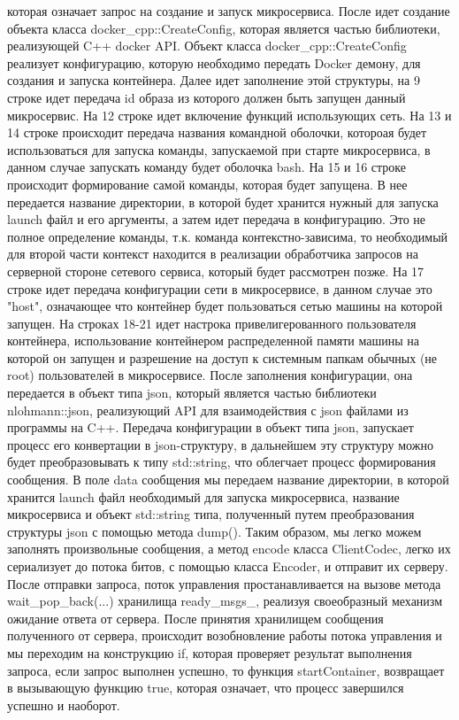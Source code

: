 \documentclass[a4paper, 14pt]{extreport}
\begin{document}
которая означает запрос на создание и запуск микросервиса. После идет создание объекта класса docker\_cpp::CreateConfig, которая является
частью библиотеки, реализующей C++ docker API. Объект класса docker\_cpp::CreateConfig реализует конфигурацию, которую необходимо 
передать Docker демону, для создания и запуска контейнера. Далее идет заполнение этой структуры, на 9 строке идет передача id образа 
из которого должен быть запущен данный микросервис. На 12 строке идет включение функций использующих сеть. На 13 и 14 строке происходит 
передача названия командной оболочки, котороая будет использоваться для запуска команды, запускаемой при старте микросервиса, в данном 
случае запускать команду будет оболочка bash. На 15 и 16 строке происходит формирование самой команды, которая будет запущена. В нее 
передается название директории, в которой будет хранится нужный для запуска launch файл и его аргументы, а затем идет передача в 
конфигурацию. Это не полное определение команды, т.к. команда контекстно-зависима, то необходимый для второй части контекст находится 
в реализации обработчика запросов на серверной стороне сетевого сервиса, который будет рассмотрен позже. На 17 строке идет передача 
конфигурации сети в микросервисе, в данном случае это "host", означающее что контейнер будет пользоваться сетью машины на которой запущен.
На строках 18-21 идет настрока привелигерованного пользователя контейнера, использование контейнером распределенной памяти машины на которой 
он запущен и разрешение на доступ к системным папкам обычных (не root) пользователей в микросервисе. После заполнения конфигурации, 
она передается в объект типа json, который является частью библиотеки nlohmann::json, реализующий API для взаимодействия с json файлами из 
программы на C++. Передача конфигурации в объект типа json, запускает процесс его конвертации в json-структуру, в дальнейшем эту структуру
можно будет преобразовывать к типу std::string, что облегчает процесс формирования сообщения. В поле data сообщения мы передаем 
название директории, в которой хранится launch файл необходимый для запуска микросервиса, название микросервиса и объект std::string типа,
полученный путем преобразования структуры json с помощью метода dump(). Таким образом, мы легко можем заполнять произвольные сообщения,
а метод encode класса ClientCodec, легко их сериализует до потока битов, с помощью класса Encoder, и отправит их серверу. После отправки 
запроса, поток управления простанавливается на вызове метода wait\_pop\_back(...) хранилища ready\_msgs\_, реализуя своеобразный механизм 
ожидание ответа от сервера. После принятия хранилищем сообщения полученного от сервера, происходит возобновление работы потока управления 
и мы переходим на конструкцию if, которая проверяет результат выполнения запроса, если запрос выполнен успешно, то функция startContainer,
возвращает в вызывающую функцию true, которая означает, что процесс завершился успешно и наоборот.
\end{document}
